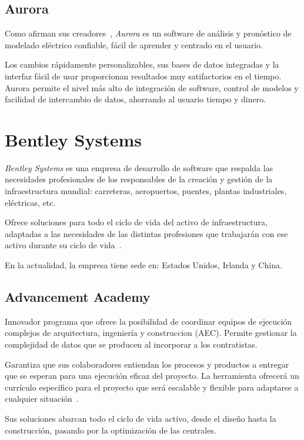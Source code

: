 \subsection{Aurora}

Como afirman sus creadores~\cite{web:EnergyExemplarAurora}, \textit{Aurora} es un software de análisis y pronóstico de modelado eléctrico confiable, fácil de aprender y centrado en el usuario.

Los cambios rápidamente personalizables, sus bases de datos integradas y la interfaz fácil de usar proporcionan resultados muy satifactorios en el tiempo. Aurora permite el nivel más alto de integración de software, control de modelos y facilidad de intercambio de datos, ahorrando al usuario tiempo y dinero.

\section{Bentley Systems}

\textit{Bentley Systems} es una empresa de desarrollo de software que respalda las necesidades profesionales de los responsables de la creación y gestión de la infraestructura mundial: carreteras, aeropuertos, puentes, plantas industriales, eléctricas, etc.

Ofrece soluciones para todo el ciclo de vida del activo de infraestructura, adaptadas a las necesidades de las distintas profesiones que trabajarán con ese activo durante su ciclo de vida~\cite{web:bentleySystems}.

En la actualidad, la empresa tiene sede en: Estados Unidos, Irlanda y China.
\subsection{Advancement Academy}

Innovador programa que ofrece la posibilidad de coordinar equipos de ejecución complejos de arquitectura, ingeniería y construccion (AEC). Permite gestionar la complejidad de datos que se producen al incorporar a los contratistas.

Garantiza que sus colaboradores entiendan los procesos y productos a entregar que se esperan para una ejecución eficaz del proyecto. La herramienta ofrecerá un currículo específico para el proyecto que será escalable y flexible para adaptarse a cualquier situación~\cite{web:bentleySystemsAdvancementAcademies}.

Sus soluciones abarcan todo el ciclo de vida activo, desde el diseño hasta la construcción, pasando por la optimización de las centrales.

